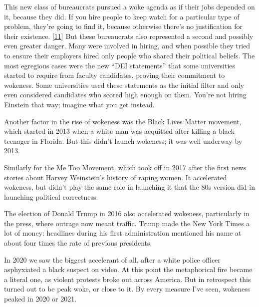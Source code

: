 This new class of bureaucrats pursued a woke agenda as if their jobs
depended on it, because they did. If you hire people to keep watch for a
particular type of problem, they're going to find it, because otherwise
there's no justification for their existence. {[}\hyperref[f11n]{11}{]}
But these bureaucrats also represented a second and possibly even
greater danger. Many were involved in hiring, and when possible they
tried to ensure their employers hired only people who shared their
political beliefs. The most egregious cases were the new ``DEI
statements'' that some universities started to require from faculty
candidates, proving their commitment to wokeness. Some universities used
these statements as the initial filter and only even considered
candidates who scored high enough on them. You're not hiring Einstein
that way; imagine what you get instead.

Another factor in the rise of wokeness was the Black Lives Matter
movement, which started in 2013 when a white man was acquitted after
killing a black teenager in Florida. But this didn't launch wokeness; it
was well underway by 2013.

Similarly for the Me Too Movement, which took off in 2017 after the
first news stories about Harvey Weinstein's history of raping women. It
accelerated wokeness, but didn't play the same role in launching it that
the 80s version did in launching political correctness.

The election of Donald Trump in 2016 also accelerated wokeness,
particularly in the press, where outrage now meant traffic. Trump made
the New York Times a lot of money: headlines during his first
administration mentioned his name at about four times the rate of
previous presidents.

In 2020 we saw the biggest accelerant of all, after a white police
officer asphyxiated a black suspect on video. At this point the
metaphorical fire became a literal one, as violent protests broke out
across America. But in retrospect this turned out to be peak woke, or
close to it. By every measure I've seen, wokeness peaked in 2020 or
2021.

